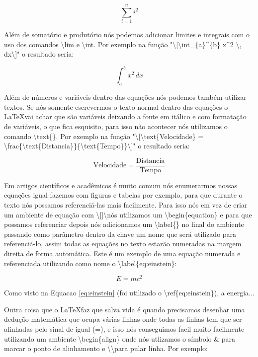 \[\sum_{i=1}^{n} i^2\] 

Além de somatório e produtório nós podemos adicionar limites e integrais com o uso dos comandos \textbackslash lim e \textbackslash int. Por exemplo na função "\textbackslash[\textbackslash int\_\{a\}\^{}\{b\} x\^{}2 \textbackslash , dx\textbackslash ]" o resultado seria:

\[\int_{a}^{b} x^2 \, dx\]

Além de números e variáveis dentro das equações nós podemos também utilizar textos. Se nós somente escrevermos o texto normal dentro das equações o \LaTeX vai achar que são variáveis deixando a fonte em itálico e com formatação de variáveis, o que fica esquisito, para isso não acontecer nós utilizamos o comando \textbackslash text\{\}. Por exemplo na função "\textbackslash [\textbackslash text\{Velocidade\} = \textbackslash frac\{\textbackslash text\{Distancia\}\}\{\textbackslash text\{Tempo\}\}\textbackslash ]" o resultado seria:

\[\text{Velocidade} = \frac{\text{Distancia}}{\text{Tempo}}\]

Em artigos científicos e acadêmicos é muito comum nós enumerarmos nossas equações igual fazemos com figuras e tabelas por exemplo, para que durante o texto nós possamos referenciá-las mais facilmente. Para isso nós em vez de criar um ambiente de equação com \textbackslash[]\textbackslash nós utilizamos um \textbackslash begin\{equation\} e para que possamos referenciar depois nós adicionamos um \textbackslash label\{\} no final do ambiente passando como parâmetro dentro da chave um nome que será utilizado para referenciá-lo, assim todas as equações no texto estarão numeradas na margem direita de forma automática. Este é um exemplo de uma equação numerada e referenciada utilizando como nome o \textbackslash label\{eq:einstein\}:

\begin{equation}
    E = mc^2
    \label{eq:einstein}
\end{equation}

Como visto na Equacao \ref{eq:einstein} (foi utilizado o \textbackslash ref\{eq:einstein\}), a energia...

Outra coisa que o \LaTeX faz que salva vida é quando precisamos desenhar uma dedução matemática que ocupa várias linhas onde todas as linhas tem que ser alinhadas pelo sinal de igual (=), e isso nós conseguimos facil muito facilmente utilizando um ambiente \textbackslash begin\{align\} onde nós utlizamos o símbolo \& para marcar o ponto de alinhamento e \textbackslash\textbackslash para pular linha. Por exemplo:

